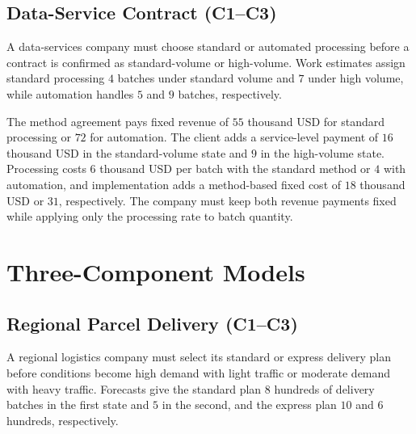 	\subsection{Data-Service Contract (C1--C3)}
	\label{sec:problem14-data-service-contract-c1-c3}

	A data-services company must choose standard or automated processing before a contract is confirmed as standard-volume or high-volume. Work estimates assign standard processing \(4\) batches under standard volume and \(7\) under high volume, while automation handles \(5\) and \(9\) batches, respectively.

	The method agreement pays fixed revenue of \(55\) thousand USD for standard processing or \(72\) for automation. The client adds a service-level payment of \(16\) thousand USD in the standard-volume state and \(9\) in the high-volume state. Processing costs \(6\) thousand USD per batch with the standard method or \(4\) with automation, and implementation adds a method-based fixed cost of \(18\) thousand USD or \(31\), respectively. The company must keep both revenue payments fixed while applying only the processing rate to batch quantity.

	\section{Three-Component Models}
	\label{sec:three-component-models}


	\subsection{Regional Parcel Delivery (C1--C3)}
	\label{sec:problem15-regional-parcel-delivery-c1-c3}

	A regional logistics company must select its standard or express delivery plan before conditions become high demand with light traffic or moderate demand with heavy traffic. Forecasts give the standard plan \(8\) hundreds of delivery batches in the first state and \(5\) in the second, and the express plan \(10\) and \(6\) hundreds, respectively.

